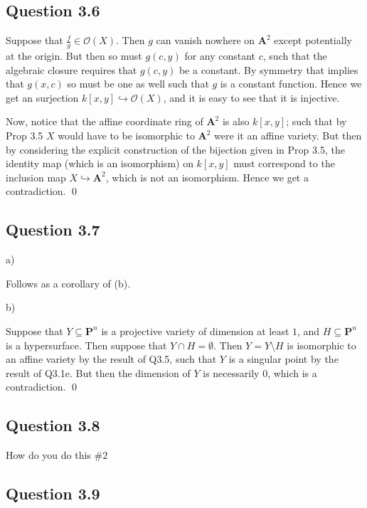 \documentclass{article}
\begin{document}
\subsection*{Question 3.6}

Suppose that $\frac{f}{g} \in \mathcal{O}(X)$. Then $g$ can vanish nowhere on $\mathbf{A}^2$ except potentially at the origin. But then so must $g(c,y)$ for any constant $c$, such that the algebraic closure requires that $g(c,y)$ be a constant. By symmetry that implies that $g(x,c)$ so must be one as well such that $g$ is a constant function. Hence we get an surjection $k[x,y]\hookrightarrow \mathcal{O}(X)$, and it is easy to see that it is injective.

Now, notice that the affine coordinate ring of $\mathbf{A}^2$ is also $k[x,y]$; such that by Prop 3.5 $X$ would have to be isomorphic to $\mathbf{A}^2$ were it an affine variety. But then by considering the explicit construction of the bijection given in Prop 3.5, the identity map (which is an isomorphism) on $k[x,y]$ must correspond to the inclusion map $X \hookrightarrow \mathbf{A}^2$, which is not an isomorphism. Hence we get a contradiction. \qed
\lspace

\subsection*{Question 3.7}

\noindent a)

Follows as a corollary of (b).

\noindent b)

Suppose that $Y \subseteq \mathbf{P}^n$ is a projective variety of dimension at least $1$, and $H \subseteq \mathbf{P}^n$ is a hypersurface. Then suppose that $Y \cap H = \emptyset$. Then $Y = Y \setminus H$ is isomorphic to an affine variety by the result of Q3.5, such that $Y$ is a singular point by the result of Q3.1e. But then the dimension of $Y$ is necessarily $0$, which is a contradiction. \qed
\lspace

\subsection*{Question 3.8}

How do you do this $\#2$

\subsection*{Question 3.9}
\end{document}
